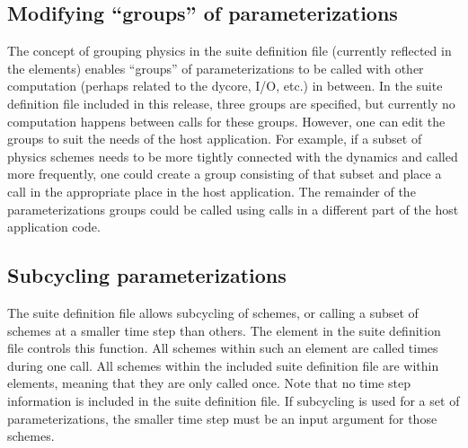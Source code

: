 \subsection{Modifying ``groups'' of parameterizations}

The concept of grouping physics in the suite definition file (currently reflected in the  elements) enables ``groups'' of parameterizations to be called with other computation (perhaps related to the dycore, I/O, etc.) in between. In the suite definition file included in this release, three groups are specified, but currently no computation happens between  calls for these groups. However, one can edit the groups to suit the needs of the host application. For example, if a subset of physics schemes needs to be more tightly connected with the dynamics and called more frequently, one could create a group consisting of that subset and place a  call in the appropriate place in the host application. The remainder of the parameterizations groups could be called using  calls in a different part of the host application code.

\subsection{Subcycling parameterizations}

The suite definition file allows subcycling of schemes, or calling a subset of schemes at a smaller time step than others. The \execout{>} element in the suite definition file controls this function. All schemes within such an element are called  times during one  call. All schemes within the included suite definition file are within \execout{>} elements, meaning that they are only called once. Note that no time step information is included in the suite definition file. If subcycling is used for a set of parameterizations, the smaller time step must be an input argument for those schemes. 




